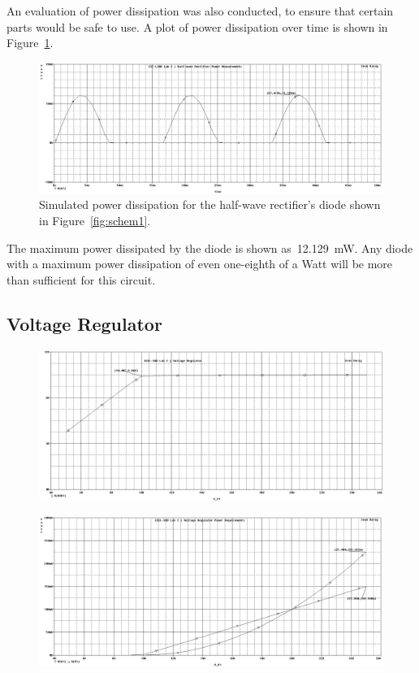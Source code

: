 An evaluation of power dissipation was also conducted, to ensure that certain
parts would be safe to use.  A plot of power dissipation over time is shown in
Figure~\ref{fig:halfwavePlotW}.
%
\begin{figure}[H]
	\centering
	\includegraphics[width=\pwidth]{img/plot/halfwavePowerPlot.PNG}
	\parbox{\pwidth}{
	\caption[PSpice Plot --- Half-wave Rectifier (Power)]{Simulated power
		dissipation for the half-wave rectifier's diode shown in
		Figure~\ref{fig:schem1}.}
	\label{fig:halfwavePlotW}}
\end{figure}
%
The maximum power dissipated by the diode is shown as~\SI{12.129}{\milli\watt}.
Any diode with a maximum power dissipation of even one-eighth of a Watt will be
more than sufficient for this circuit.

\subsection{Voltage Regulator}
\begin{figure}[H]
	\centering
	\includegraphics[width=\pwidth]{img/plot/zenerPlot.PNG}
	\parbox{\pwidth}{
	\caption{}
	\label{fig:zenerPlotV}}
\end{figure}

\begin{figure}[H]
	\centering
	\includegraphics[width=\pwidth]{img/plot/zenerPowerPlot.PNG}
	\parbox{\pwidth}{
	\caption{}
	\label{fig:zenerPlotW}}
\end{figure}


